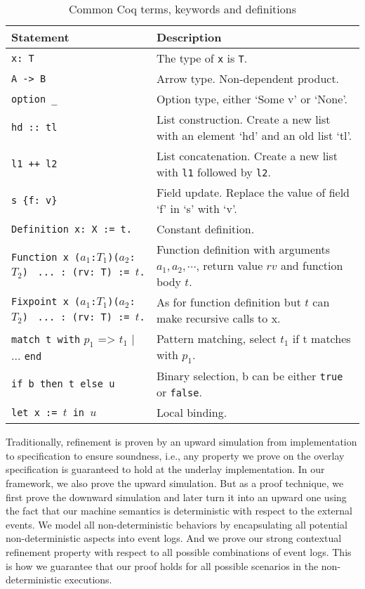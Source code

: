 \begin{table}
	\begin{tabular}[t]{p{}p{}}
	\hline
		{\centering Statement}	&	{\centering Description} \\
	\hline
		\texttt{x: T}					&	The type of \texttt{x} is \texttt{T}.\\
		\texttt{A -> B}					& 	Arrow type. Non-dependent product.\\
		\texttt{option \_}				&	Option type, either `Some v' or `None'.\\
		\texttt{hd :: tl}				&	List construction. Create a new list with an element `hd' and an old list `tl'.\\
		\texttt{l1 ++ l2}				& 	List concatenation. Create a new list with \texttt{l1} followed by \texttt{l2}.\\
		\texttt{s \{f: v\}}				&	Field update. Replace the value of field `f' in `s' with `v'. \\
		\texttt{Definition x: X := t.}	&	Constant definition. \\
		\parbox[t]{.3\textwidth}{\texttt{Function x ($a_1$:$T_1$)($a_2$:$T_2$)}\\
		\texttt{\hphantom{Func} ... : (rv: T) := $t$.}}
		 & Function definition with arguments $a_1, a_2, \cdots$, return value $rv$ and function body $t$.\\
		 \parbox[t]{.3\textwidth}{\texttt{Fixpoint x ($a_1$:$T_1$)($a_2$:$T_2$)}\\
		 \texttt{\hphantom{Fixp} ... : (rv: T) := $t$.}}
		 & As for function definition but $t$ can make recursive calls to x. \\
		\texttt{match t with} $p_1$ => $t_1$ | ...	\texttt{end}	&	Pattern matching, select $t_1$ if t matches with $p_1$.\\
		\texttt{if b then t else u}		&	Binary selection, b can be either \texttt{true} or \texttt{false}.\\
		\texttt{let x := $t$ in $u$}	&	Local binding.\\
		\hline
	\end{tabular}
	\caption{Common Coq terms, keywords and definitions}
	\label{table:coq}
\end{table}


Traditionally, refinement is proven by an upward simulation from implementation
to specification to ensure soundness, i.e., any property we prove on the overlay
specification is guaranteed to hold at the underlay implementation. In our framework,
we also prove the upward simulation. But as a proof technique, we first prove the
downward simulation and later turn it into an upward one using the fact that our
machine semantics is deterministic with respect to the external events. We model
all non-deterministic behaviors by encapsulating all potential non-deterministic aspects
into event logs. And we prove our strong contextual refinement property with respect
to all possible combinations of event logs. This is how we guarantee
that our proof holds for all possible scenarios in the non-deterministic
executions. 


